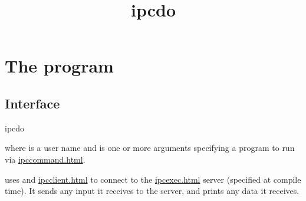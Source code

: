 \documentclass{book}
\title{ipcdo}
\begin{document}
\section{The  program}

\subsection{Interface}
\begin{code}%
  ipcdo  
\end{code}
where  is a user name and  is one or more arguments
specifying a program to run via \href{\cmd{ipccommand}}{ipccommand.html}.

 uses  and \href{\cmd{ipcclient}}{ipcclient.html} to
connect to the \href{\cmd{ipcexec}}{ipcexec.html} server (specified at compile
time).  It sends any input it receives to the  server, and prints
any data it receives.
\end{document}
